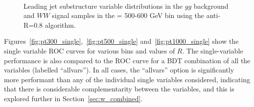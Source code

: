 \begin{figure}
\centering
{}
\\
\caption{Leading jet substructure variable distributions in the $gg$
  background and $WW$ signal samples in the \pT = 500-600 GeV bin using the anti-\kT R=0.8 algorithm.}
\label{fig:pt500_subst_AKt_R08}
\end{figure}


Figures~\ref{fig:pt300_single},~\ref{fig:pt500_single}
and~\ref{fig:pt1000_single} show the single variable ROC curves
for various \pT bins and values of $R$. The single-variable performance is also
compared to the ROC curve for a BDT combination of all the variables
(labelled ``allvars''). In all cases, the ``allvars'' option
is significantly more performant than any of the individual single variables
considered, indicating that there is considerable complementarity
between the variables, and this is explored further in Section~\ref{sec:w_combined}.

